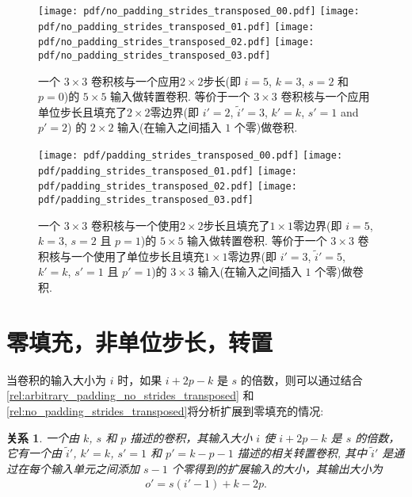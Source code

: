 \documentclass[notitlepage]{ctexrep}
\newtheorem{relationship}{关系}
\begin{document}
\begin{figure}[p]
    \centering
    \texttt{[image: pdf/no\_padding\_strides\_transposed\_00.pdf]}
    \texttt{[image: pdf/no\_padding\_strides\_transposed\_01.pdf]}
    \texttt{[image: pdf/no\_padding\_strides\_transposed\_02.pdf]}
    \texttt{[image: pdf/no\_padding\_strides\_transposed\_03.pdf]}
    \caption{\label{fig:no_padding_strides_transposed} 
    一个 $3 \times 3$ 卷积核与一个应用$2 \times 2$步长(即 $i = 5$, $k = 3$, $s = 2$ 和 $p = 0$)的 $5 \times 5$ 输入做转置卷积. 等价于一个 $3 \times 3$ 卷积核与一个应用单位步长且填充了$2 \times 2$零边界(即 $i' = 2$, $\tilde{i}' = 3$, $k' = k$, $s' = 1$ and $p' = 2$) 的 $2 \times 2$ 输入(在输入之间插入 $1$ 个零)做卷积.}
\end{figure}

\begin{figure}[p]
    \centering
    \texttt{[image: pdf/padding\_strides\_transposed\_00.pdf]}
    \texttt{[image: pdf/padding\_strides\_transposed\_01.pdf]}
    \texttt{[image: pdf/padding\_strides\_transposed\_02.pdf]}
    \texttt{[image: pdf/padding\_strides\_transposed\_03.pdf]}
    \caption{\label{fig:padding_strides_transposed} 
    一个 $3 \times 3$ 卷积核与一个使用$2 \times 2$步长且填充了$1 \times 1$零边界(即 $i = 5$, $k = 3$, $s = 2$ 且 $p = 1$)的 $5 \times 5$ 输入做转置卷积. 等价于一个 $3 \times 3$ 卷积核与一个使用了单位步长且填充$1 \times 1$零边界(即 $i' = 3$, $\tilde{i}' = 5$, $k' = k$, $s' = 1$ 且 $p' = 1$)的 $3 \times 3$ 输入(在输入之间插入 $1$ 个零)做卷积.}
\end{figure}

\section{零填充，非单位步长，转置} 

当卷积的输入大小为 $i$ 时，如果 $i + 2p - k$ 是 $s$ 的倍数，则可以通过结合
\autoref{rel:arbitrary_padding_no_strides_transposed} 和
\autoref{rel:no_padding_strides_transposed}将分析扩展到零填充的情况:

\begin{relationship}\label{rel:padding_strides_transposed}
一个由 $k$, $s$ 和 $p$ 描述的卷积，其输入大小 $i$ 使 $i + 2p - k$ 是 $s$ 的倍数，它有一个由 $\tilde{i}'$, $k' = k$, $s' = 1$ 和 $p' = k - p - 1$ 描述的相关转置卷积, 其中 $\tilde{i}'$ 是通过在每个输入单元之间添加 $s - 1$ 个零得到的扩展输入的大小，其输出大小为
\begin{equation*}
\begin{split}
    o' = s (i' - 1) + k - 2p.
\end{split}
\end{equation*}
\end{relationship}
\end{document}
